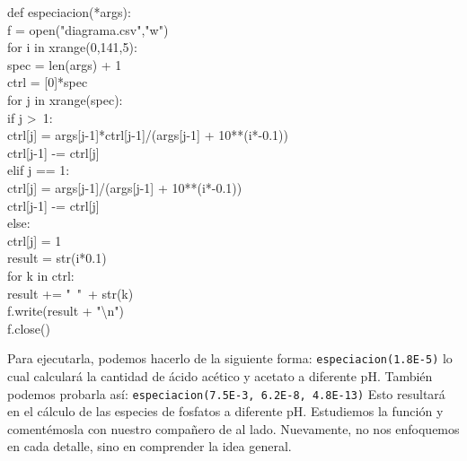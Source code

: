 \documentclass[10pt,letterpaper]{article}
\newcommand{\inlinecode}[1]{
\colorbox{light-gray}{\texttt{#1}}
}
\newenvironment{Code}
{
\begin{lrbox}{\selvestebox}%
\begin{minipage}{\dimexpr\columnwidth-2\fboxsep\relax}
\fontfamily{\ttdefault}\selectfont
}
{\end{minipage}\end{lrbox}%
\begin{center}
\colorbox{light-gray}{\usebox{\selvestebox}}
\end{center}
}
\begin{document}
\begin{Code}
def especiacion(*args):\\
\hspace*{6mm} f = open("diagrama.csv","w")\\
\hspace*{6mm} for i in xrange(0,141,5):\\
\hspace*{13mm} spec = len(args) + 1\\
\hspace*{13mm} ctrl = [0]*spec\\
\hspace*{13mm} for j in xrange(spec):\\
\hspace*{21mm} if j >\ 1:\\
\hspace*{28mm} ctrl[j] = args[j-1]*ctrl[j-1]/(args[j-1] + 10**(i*-0.1))\\
\hspace*{28mm} ctrl[j-1] -= ctrl[j]\\
\hspace*{21mm} elif j == 1:\\
\hspace*{28mm} ctrl[j] = args[j-1]/(args[j-1] + 10**(i*-0.1))\\
\hspace*{28mm} ctrl[j-1] -= ctrl[j]\\
\hspace*{21mm} else:\\
\hspace*{28mm} ctrl[j] = 1\\
\hspace*{13mm} result = str(i*0.1)\\
\hspace*{13mm} for k in ctrl:\\
\hspace*{21mm} result += "\ "\ + str(k)\\
\hspace*{13mm} f.write(result + "\textbackslash n")\\
\hspace*{6mm} f.close()
\end{Code}

Para ejecutarla, podemos hacerlo de la siguiente forma: \inlinecode{especiacion(1.8E-5)} lo cual calcular\'a la cantidad de \'acido ac\'etico y acetato a diferente pH. Tambi\'en podemos probarla as\'i: \inlinecode{especiacion(7.5E-3, 6.2E-8, 4.8E-13)} Esto resultar\'a en el c\'alculo de las especies de fosfatos a diferente pH. Estudiemos la funci\'on y coment\'emosla con nuestro compa\~nero de al lado. Nuevamente, no nos enfoquemos en cada detalle, sino en comprender la idea general.\\
\end{document}
